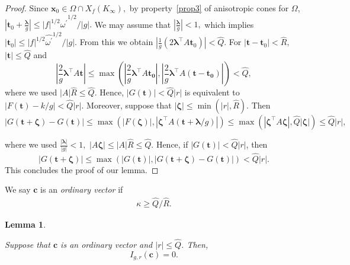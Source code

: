\documentclass[10pt]{amsart}
\theoremstyle{plain}
\theoremstyle{plain}
\newtheorem{lemma}[theorem]{Lemma}
\renewcommand{\vec}[1]{\mathbf{#1}}
\theoremstyle{remark}
\theoremstyle{definition}
\renewcommand{\hat}{\widehat}
\newcommand{\ki}{K_\infty}
\newcommand{\hQ}{\widehat{Q}}
\newcommand{\hR}{\widehat{R}}
\begin{document}
\begin{proof}
Since $\vec{x}_0\in \Omega\cap X_f(\ki),$ by property~\eqref{prop3} of anisotropic cones for $\Omega$, $|\vec{t}_0+\frac{\boldsymbol{\lambda}}{g}|\leq |f|^{1/2} \hat{\omega^{\prime}}^{1/2}/|g|.$ We may assume that $\left|\frac{\boldsymbol{\lambda}}{g} \right|< 1,$ which implies    $|\vec{t}_0| \leq |f|^{1/2} \hat{\omega^{\prime}}^{1/2}/|g|.$ 
 From this   we obtain   $|\frac{1}{g}(2\boldsymbol{\lambda}^{\intercal} A\vec{t}_0)| <\hQ.$ For $|\vec{t}-\vec{t}_0|<\hR,$ $|\vec{t}|\leq \hQ$ and
 \[
 \left|\frac{2}{g}\boldsymbol{\lambda}^{\intercal} A\vec{t}\right| \leq \max\left(\left |\frac{2}{g}\boldsymbol{\lambda}^{\intercal} A\vec{t_0}\right|,    \left|\frac{2}{g}\boldsymbol{\lambda}^{\intercal} A(\vec{t}-\vec{t_0})\right| \right)<\hQ,
 \]
 where we used $|A|\hR \leq \hQ.$
  Hence, $|G(\vec{t})| < \hQ|r|$ is equivalent to $|F(\vec{t})-k/g|<\hQ |r|.$ Moreover, suppose that $|\boldsymbol{\zeta}| \leq \min(|r|,\hR).$  Then 
\[
|G(\vec{t}+\boldsymbol{\zeta})-G(\vec{t})| \leq \max\left( |F(\boldsymbol{\zeta})| ,|\boldsymbol{\zeta}^{\intercal}A(\vec{t}+\boldsymbol{\lambda}/g)|\right) \leq \max(|\boldsymbol{\zeta}^{\intercal}A\boldsymbol{\zeta}|,\hQ|\boldsymbol{\zeta}|)\leq \hQ |r|,
\]

where we used  $\frac{|\boldsymbol{\lambda}|}{|g|}<1 ,$ $|A\boldsymbol\zeta|\leq |A|\hR\leq \hQ.$ Hence, if $|G(\vec{t})|< \hQ|r|$, then
  \begin{equation}\label{invbal}|G(\vec{t}+\boldsymbol{\zeta})| \leq \max(|G(\vec{t})|, |G(\vec{t}+\boldsymbol{\zeta})-G(\vec{t})| )  < \hQ|r|.
  \end{equation}
This concludes the proof of our lemma.
\end{proof}
We say  $\vec{c}$ is an \textit{ordinary vector} if 
\begin{eqnarray}\label{typeI}
\kappa \geq \hQ/\hR.
\end{eqnarray}
\begin{lemma}\label{o}
 
Suppose that $\vec{c}$ is an ordinary vector and $|r| \leq\hQ$. Then, \begin{equation}\label{type1}
I_{g,r}(\vec{c})=0.
\end{equation}
\end{lemma}
\end{document}
